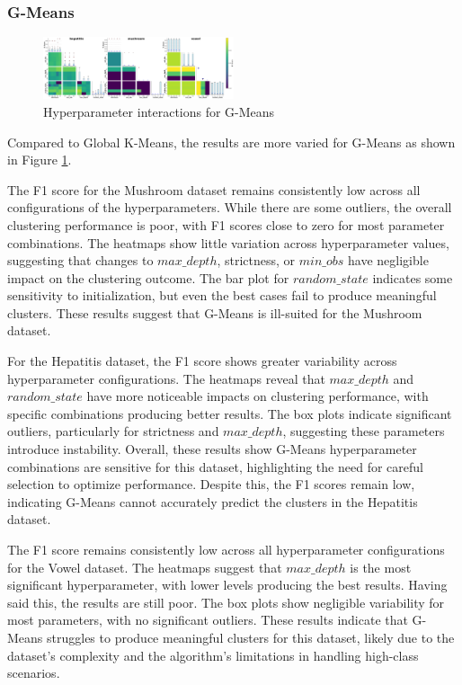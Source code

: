 \subsubsection{G-Means}
\label{subsec:gmeansresults}

\begin{figure}[h!]
    \centering
    \includegraphics[width=0.5\textwidth]{figures/interactions_gmeans.png}
    \caption{Hyperparameter interactions for G-Means}
    \label{fig:interactions_gmeans}
\end{figure}

Compared to Global K-Means, the results are more varied for G-Means as shown in Figure \ref{fig:interactions_gmeans}.

The F1 score for the Mushroom dataset remains consistently low across all configurations of the hyperparameters.
While there are some outliers, the overall clustering performance is poor, with F1 scores close to zero for most parameter combinations.
The heatmaps show little variation across hyperparameter values, suggesting that changes to $max\_depth$, strictness, or $min\_obs$ have
negligible impact on the clustering outcome. The bar plot for $random\_state$ indicates some sensitivity to initialization, but even
the best cases fail to produce meaningful clusters. These results suggest that G-Means is ill-suited for the Mushroom dataset.

For the Hepatitis dataset, the F1 score shows greater variability across hyperparameter configurations. The heatmaps reveal that
$max\_depth$ and $random\_state$ have more noticeable impacts on clustering performance, with specific combinations producing
better results. The box plots indicate significant outliers, particularly for strictness and $max\_depth$, suggesting these parameters
introduce instability. Overall, these results show G-Means hyperparameter combinations are sensitive for this dataset,
highlighting the need for careful selection to optimize performance. Despite this, the F1 scores remain low, indicating G-Means
cannot accurately predict the clusters in the Hepatitis dataset.

The F1 score remains consistently low across all hyperparameter configurations for the Vowel dataset.
The heatmaps suggest that $max\_depth$ is the most significant hyperparameter, with lower levels producing the best results.
Having said this, the results are still poor. The box plots show negligible variability for most parameters, with no significant outliers.
These results indicate that G-Means struggles to produce meaningful clusters for this dataset,
likely due to the dataset's complexity and the algorithm's limitations in handling high-class scenarios.